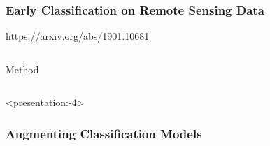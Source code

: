 \begin{frame}
\frametitle{Early Classification on Remote Sensing Data}


\url{https://arxiv.org/abs/1901.10681}

\end{frame}

%	
%	
%	


{
	\begin{frame}[plain]
	
	\vfill
	\Huge\color{white}
	\begin{center}
		\begin{columns}
			\vspace{7em}
			
			\hfill 
			Method
			
		\end{columns}
	\end{center}
	
	\vfill
\end{frame}
}

\begin{frame}<presentation:-4>
\frametitle{Augmenting Classification Models}

\begin{columns}
	
	\column{.5\textwidth}
	\begin{center}
		
		
	\end{center}
	\column{.5\textwidth}
	
	
	
\end{columns}

\end{frame}
%
%
%
%

